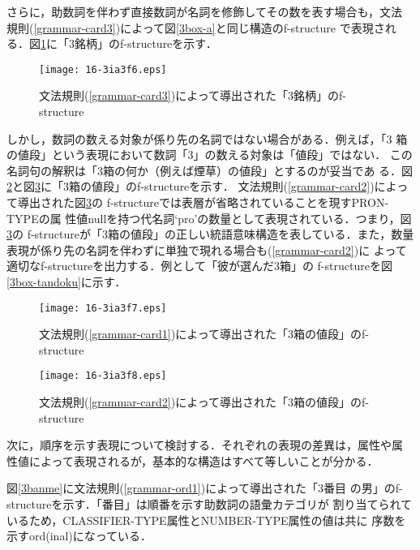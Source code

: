 \documentclass[japanese]{jnlp_1.4}
\begin{document}
さらに，助数詞を伴わず直接数詞が名詞を修飾してその数を表す場合も，文法
規則(\ref{grammar-card3})によって図\ref{3box-a}と同じ構造のf-structure
で表現される．図\ref{3meigara}に「3銘柄」のf-structureを示す．

\begin{figure}[t]
\begin{center}
\texttt{[image: 16-3ia3f6.eps]}
\end{center}
\caption{文法規則(\ref{grammar-card3})によって導出された「3銘柄」のf-structure}
\label{3meigara}
\end{figure}

しかし，数詞の数える対象が係り先の名詞ではない場合がある．例えば，「3
箱の値段」という表現において数詞「3」の数える対象は「値段」ではない．
この名詞句の解釈は「3箱の何か（例えば煙草）の値段」とするのが妥当であ
る．図\ref{3box-c}と図\ref{3box-d}に「3箱の値段」のf-structureを示す．
文法規則(\ref{grammar-card2})によって導出された図\ref{3box-d}の
f-structureでは表層が省略されていることを現すPRON-TYPEの属
性値nullを持つ代名詞`pro'の数量として表現されている．つまり，図\ref{3box-d}の
f-structureが「3箱の値段」の正しい統語意味構造を表している．また，数量
表現が係り先の名詞を伴わずに単独で現れる場合も(\ref{grammar-card2})に
よって適切なf-structureを出力する．例として「彼が選んだ3箱」の
f-structureを図\ref{3box-tandoku}に示す．

\begin{figure}[t]
\begin{center}
\texttt{[image: 16-3ia3f7.eps]}
\end{center}
\caption{文法規則(\ref{grammar-card1})によって導出された「3箱の値段」のf-structure}
\label{3box-c}
\end{figure}
\begin{figure}[t]
\begin{center}
\texttt{[image: 16-3ia3f8.eps]}
\end{center}
\caption{文法規則(\ref{grammar-card2})によって導出された「3箱の値段」のf-structure}
\label{3box-d}
\end{figure}

次に，順序を示す表現について検討する．それぞれの表現の差異は，属性や属
性値によって表現されるが，基本的な構造はすべて等しいことが分かる．

図\ref{3banme}に文法規則(\ref{grammar-ord1})によって導出された「3番目
の男」のf-structureを示す．「番目」は順番を示す助数詞の語彙カテゴリが
割り当てられているため，CLASSIFIER-TYPE属性とNUMBER-TYPE属性の値は共に
序数を示すord(inal)になっている．
\end{document}
